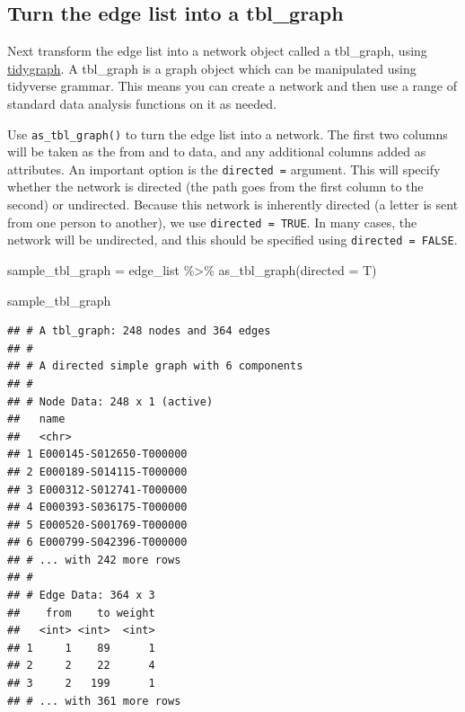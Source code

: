 \documentclass[
]{book}
\newenvironment{Shaded}{\begin{snugshade}}{\end{snugshade}}
\newcommand{\AttributeTok}[1]{\textcolor[rgb]{0.77,0.63,0.00}{#1}}
\newcommand{\FunctionTok}[1]{\textcolor[rgb]{0.00,0.00,0.00}{#1}}
\newcommand{\NormalTok}[1]{#1}
\newcommand{\OtherTok}[1]{\textcolor[rgb]{0.56,0.35,0.01}{#1}}
\newcommand{\SpecialCharTok}[1]{\textcolor[rgb]{0.00,0.00,0.00}{#1}}
\begin{document}
\hypertarget{turn-the-edge-list-into-a-tbl_graph}{%
\subsection{Turn the edge list into a tbl\_graph}\label{turn-the-edge-list-into-a-tbl_graph}}

Next transform the edge list into a network object called a tbl\_graph, using \href{https://www.data-imaginist.com/2017/introducing-tidygraph/}{tidygraph}. A tbl\_graph is a graph object which can be manipulated using tidyverse grammar. This means you can create a network and then use a range of standard data analysis functions on it as needed.

Use \texttt{as\_tbl\_graph()} to turn the edge list into a network. The first two columns will be taken as the from and to data, and any additional columns added as attributes. An important option is the \texttt{directed\ =} argument. This will specify whether the network is directed (the path goes from the first column to the second) or undirected. Because this network is inherently directed (a letter is sent from one person to another), we use \texttt{directed\ =\ TRUE}. In many cases, the network will be undirected, and this should be specified using \texttt{directed\ =\ FALSE}.

\begin{Shaded}
\begin{Highlighting}[]
\NormalTok{sample\_tbl\_graph }\OtherTok{=}\NormalTok{ edge\_list }\SpecialCharTok{\%\textgreater{}\%} 
  \FunctionTok{as\_tbl\_graph}\NormalTok{(}\AttributeTok{directed =}\NormalTok{ T)}

\NormalTok{sample\_tbl\_graph}
\end{Highlighting}
\end{Shaded}

\begin{verbatim}
## # A tbl_graph: 248 nodes and 364 edges
## #
## # A directed simple graph with 6 components
## #
## # Node Data: 248 x 1 (active)
##   name                   
##   <chr>                  
## 1 E000145-S012650-T000000
## 2 E000189-S014115-T000000
## 3 E000312-S012741-T000000
## 4 E000393-S036175-T000000
## 5 E000520-S001769-T000000
## 6 E000799-S042396-T000000
## # ... with 242 more rows
## #
## # Edge Data: 364 x 3
##    from    to weight
##   <int> <int>  <int>
## 1     1    89      1
## 2     2    22      4
## 3     2   199      1
## # ... with 361 more rows
\end{verbatim}
\end{document}
